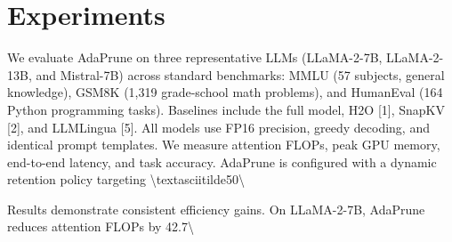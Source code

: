\documentclass[11pt,a4paper]{article}
\begin{document}
\section{Experiments}
We evaluate AdaPrune on three representative LLMs (LLaMA-2-7B, LLaMA-2-13B, and Mistral-7B) across standard benchmarks: MMLU (57 subjects, general knowledge), GSM8K (1,319 grade-school math problems), and HumanEval (164 Python programming tasks). Baselines include the full model, H2O [1], SnapKV [2], and LLMLingua [5]. All models use FP16 precision, greedy decoding, and identical prompt templates. We measure attention FLOPs, peak GPU memory, end-to-end latency, and task accuracy. AdaPrune is configured with a dynamic retention policy targeting \textbackslash{}textasciitilde{}50\textbackslash{}%

Results demonstrate consistent efficiency gains. On LLaMA-2-7B, AdaPrune reduces attention FLOPs by 42.7\textbackslash{}%
\end{document}
